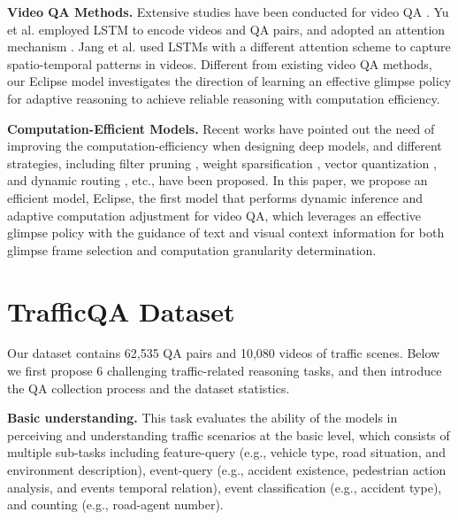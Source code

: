 \documentclass[final]{cvpr}
\begin{document}
\textbf{Video QA Methods.}
Extensive studies have been conducted for video QA \cite{yu2017end,jang2017tgif,garcia2020knowledge,Jiang_2020_CVPR,Kim_2020_CVPR,lei-etal-2020-tvqa,tsai2019GSTEG,li2019beyond,Kim_2018_ECCV,Yu_2018_ECCV,sukhbaatar2015end,wang2018movie,fan2019heterogeneous,liang2018focal,tensoremnlp17,8654010}. 
Yu et al. \cite{yu2017end} employed LSTM to encode videos and QA pairs, and adopted an attention mechanism \cite{you2016image}. 
Jang et al. \cite{jang2017tgif} used LSTMs with a different attention scheme to capture spatio-temporal patterns in videos. 
Different from existing video QA methods, our Eclipse model investigates the direction of learning an effective glimpse policy for adaptive reasoning to achieve reliable reasoning with computation efficiency.

\textbf{Computation-Efficient Models.}
Recent works \cite{Bhardwaj_2019_CVPR,Mu_2019_CVPR,strubell2019energy,figurnov2017spatially, korbar2019scsampler,wu2019adaframe,schwartz2019green,NEURIPS2019_bd853b47, fan2020adaptive} have pointed out the need of improving the computation-efficiency when designing deep models, and 
different strategies, including filter pruning \cite{li2016pruning}, weight sparsification \cite{sun2016sparsifying}, vector quantization \cite{agustsson2017soft}, and dynamic routing \cite{wang2018skipnet}, etc., have been proposed. In this paper, we propose an efficient model, Eclipse, the first model that performs dynamic inference and adaptive computation adjustment for video QA, which leverages an effective glimpse policy with the guidance of text and visual context information for both glimpse frame selection and computation granularity determination.

\section{TrafficQA Dataset}\label{section:dataset}

Our dataset contains 62,535 QA pairs and 10,080 videos of traffic scenes. Below we first propose 6 challenging traffic-related reasoning tasks, and then introduce the QA collection process and the dataset statistics. 

{\bf Basic understanding.} This task evaluates the ability of the models in perceiving and understanding traffic scenarios at the basic level, which consists of multiple sub-tasks including feature-query (e.g., vehicle type, road situation, and environment description), event-query (e.g., accident existence, pedestrian action analysis, and events temporal relation), event classification (e.g., accident type), and counting (e.g., road-agent number). 
\end{document}

